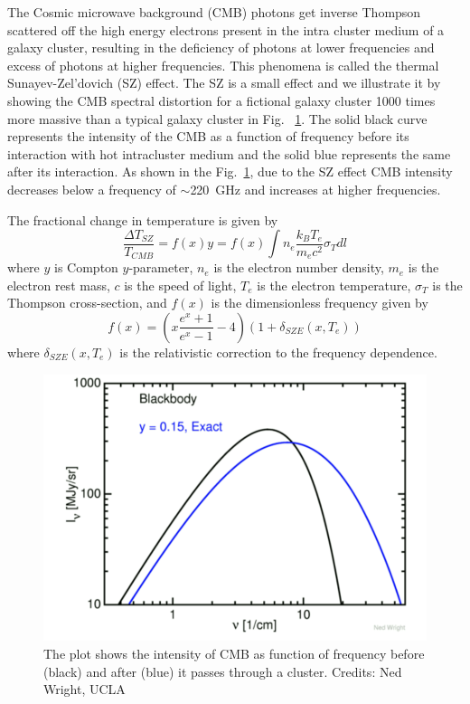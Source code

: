  The Cosmic microwave background (CMB) photons get inverse Thompson scattered off the high energy electrons present in the intra cluster medium of a galaxy cluster, resulting in the deficiency of photons at lower frequencies and excess of photons at higher frequencies. 
 This phenomena is called the thermal Sunayev-Zel'dovich (SZ) effect. 
 The SZ is a small effect and we illustrate it by showing the CMB spectral distortion for a fictional galaxy cluster 1000 times more massive than a typical galaxy cluster in Fig. ~\ref{ned_plot}. %
 The solid black curve represents the intensity of the CMB as a function of frequency before its interaction with hot intracluster medium and the solid blue represents the same after its interaction.
 As shown in the Fig.~\ref{ned_plot}, due to the SZ effect CMB intensity decreases below a frequency of $\sim$220 \,GHz and increases at higher frequencies. 
   
The fractional change in temperature is given by 
\begin{equation}
\label{eq:sz_eqn}
\frac{\Delta T_{SZ}}{T_{CMB}} = f(x) y = f(x) \int n_{e} \frac{k_{B}T_{e}}{m_{e}c^{2}} \sigma_{T} dl
\end{equation}
where $y$ is Compton $y$-parameter, $n_{e}$ is the electron number density, $m_{e}$ is the electron rest mass, $c$ is the speed of light,  $T_{e}$ is the electron temperature, $\sigma_{T}$ is the Thompson cross-section, and $f(x)$ is the dimensionless frequency given by
\begin{equation}
f(x) = \left(x\frac{e^{x}+1}{e^{x}-1} -4 \right ) \left(1 + \delta_{SZE}(x,T_{e}) \right)
\end{equation} 
where $\delta_{SZE}(x,T_{e})$ is the relativistic correction to the frequency dependence.
\begin{figure}[ht]
\includegraphics[width=\linewidth]{figs/tSZ_effect_Ned.png}
\caption{The plot shows the intensity of CMB as function of frequency before (black) and after (blue) it passes through a cluster. Credits: {Ned Wright, UCLA} }
\label{ned_plot}
\end{figure}

